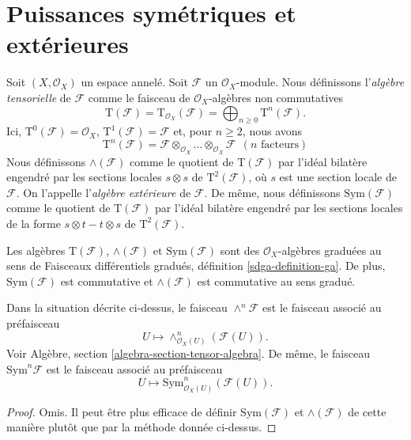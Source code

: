 \section{Puissances symétriques et extérieures}
\label{section-symmetric-exterior}

\noindent
Soit $(X, \mathcal{O}_X)$ un espace annelé.
Soit $\mathcal{F}$ un $\mathcal{O}_X$-module.
Nous définissons l'{\it algèbre tensorielle} de $\mathcal{F}$ comme
le faisceau de $\mathcal{O}_X$-algèbres non commutatives
$$
\text{T}(\mathcal{F})
=
\text{T}_{\mathcal{O}_X}(\mathcal{F})
= \bigoplus\nolimits_{n \geq 0} \text{T}^n(\mathcal{F}).
$$
Ici, $\text{T}^0(\mathcal{F}) = \mathcal{O}_X$,
$\text{T}^1(\mathcal{F}) = \mathcal{F}$
et, pour $n \geq 2$, nous avons
$$
\text{T}^n(\mathcal{F}) =
\mathcal{F} \otimes_{\mathcal{O}_X} \ldots \otimes_{\mathcal{O}_X} \mathcal{F}
\ \ (n\text{ facteurs})
$$
Nous définissons $\wedge(\mathcal{F})$ comme le quotient de
$\text{T}(\mathcal{F})$ par l'idéal bilatère engendré par les
sections locales $s \otimes s$ de $\text{T}^2(\mathcal{F})$, où
$s$ est une section locale de $\mathcal{F}$. On l'appelle
l'{\it algèbre extérieure} de $\mathcal{F}$.
De même, nous définissons $\text{Sym}(\mathcal{F})$ comme
le quotient de $\text{T}(\mathcal{F})$ par l'idéal
bilatère engendré par les sections locales de la forme
$s \otimes t - t \otimes s$ de $\text{T}^2(\mathcal{F})$.

\medskip\noindent
Les algèbres $\text{T}(\mathcal{F})$, $\wedge(\mathcal{F})$ et
$\text{Sym}(\mathcal{F})$ sont des $\mathcal{O}_X$-algèbres graduées
au sens de Faisceaux différentiels gradués, définition
\ref{sdga-definition-ga}.
De plus, $\text{Sym}(\mathcal{F})$
est commutative et $\wedge(\mathcal{F})$ est commutative au sens gradué.

\begin{lemma}
\label{lemma-local-tensor-algebra}
Dans la situation décrite ci-dessus,
le faisceau $\wedge^n\mathcal{F}$ est le faisceau associé au
préfaisceau
$$
U \longmapsto \wedge^n_{\mathcal{O}_X(U)}(\mathcal{F}(U)).
$$
Voir Algèbre, section \ref{algebra-section-tensor-algebra}.
De même, le faisceau $\text{Sym}^n\mathcal{F}$ est le faisceau associé
au préfaisceau
$$
U \longmapsto \text{Sym}^n_{\mathcal{O}_X(U)}(\mathcal{F}(U)).
$$
\end{lemma}

\begin{proof}
Omis. Il peut être plus efficace de définir $\text{Sym}(\mathcal{F})$
et $\wedge(\mathcal{F})$ de cette manière plutôt que par la méthode
donnée ci-dessus.
\end{proof}

